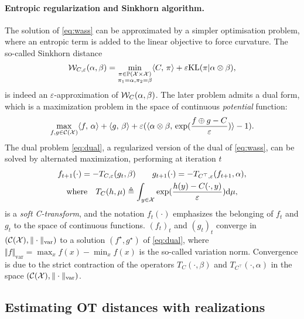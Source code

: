 \paragraph{Entropic regularization and Sinkhorn algorithm.} 
The solution of \eqref{eq:wass} can be approximated by a simpler optimisation problem, where an entropic term is added to the linear objective to force curvature. The so-called Sinkhorn distance
\begin{equation}\label{eq:wass}
    \mathcal{W}_{C,\varepsilon}(\alpha, \beta) = 
    \min_{
    \substack{
        \pi \in \mathbb{P}(\mathcal{X} \times \mathcal{X})
        \\\pi_1 = \alpha, \pi_2 = \beta
    }    
    } \langle C,\,\pi\rangle + \varepsilon \textrm{KL}(\pi | \alpha \otimes \beta),
\end{equation}
is indeed an $\varepsilon$-approximation of $\mathcal{W}_C(\alpha,\beta)$. The later problem admits a dual form, which is a maximization problem in
the space of continuous \textit{potential} function:
\begin{equation}\label{eq:dual}
    \max_{f, g \in \mathcal{C}(\mathcal{X})} \langle f,\,\alpha\rangle + \langle g,\,\beta\rangle
    + \varepsilon (\langle \alpha \otimes \beta,\,\exp(\frac{f \oplus g - C}{\varepsilon})\rangle - 1).
\end{equation}
The dual problem
\eqref{eq:dual}, a regularized version of the dual of \eqref{eq:wass}, can be solved by alternated maximization, performing at iteration $t$
\begin{gather}\label{eq:sinkhorn}
    f_{t+1}(\cdot) = - T_{C,\varepsilon}(g_t, \beta) \qquad
    g_{t+1}(\cdot) = - T_{C^\top,\varepsilon}(f_{t+1}, \alpha), \\
    \text{where} \quad T_C(h, \mu) \triangleq \int_{y \in \mathcal{X}} \exp(\frac{h(y) - C(\cdot, y)}{\varepsilon})\textrm{d} \mu,
\end{gather}
is a \textit{soft C-transform}, and the notation $f_t(\cdot)$ emphasizes the
belonging of $f_t$ and $g_t$ to the space of continuous functions. ${(f_t)}_t$
and ${(g_t)}_t$ converge in $(\mathcal{C}(\mathcal{X}), \Vert \cdot \Vert_{\text{var}})$ to a
solution $(f^\star, g^\star)$ of \eqref{eq:dual}, where $\Vert f
\Vert_{\text{var}} = \max_x f(x) - \min_x f(x)$ is the so-called variation norm. 
Convergence is due to the strict contraction of the operators $T_C(\cdot, \beta)$ and
$T_{C^\top}(\cdot, \alpha)$ in the space $(\mathcal{C}(\mathcal{X}), \Vert \cdot \Vert_{\text{var}})$.

\subsection{Estimating OT distances with realizations}

